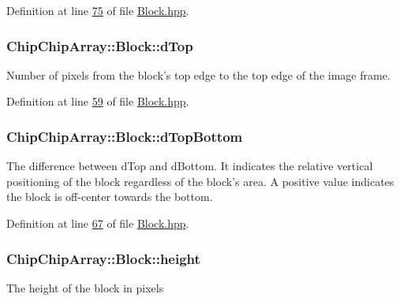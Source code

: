 Definition at line \hyperlink{Block_8hpp_source_l00075}{75} of file \hyperlink{Block_8hpp_source}{Block.\+hpp}.

\hypertarget{classChipChipArray_1_1Block_a4e792a05f677eafbeb9439a9e631c255}{
\subsubsection[{d\+Top}]{ Chip\+Chip\+Array\+::\+Block\+::d\+Top}}\label{classChipChipArray_1_1Block_a4e792a05f677eafbeb9439a9e631c255}
Number of pixels from the block's top edge to the top edge of the image frame. 

Definition at line \hyperlink{Block_8hpp_source_l00059}{59} of file \hyperlink{Block_8hpp_source}{Block.\+hpp}.

\hypertarget{classChipChipArray_1_1Block_a5b6e72665d0de840a123717e24ca5cf9}{
\subsubsection[{d\+Top\+Bottom}]{ Chip\+Chip\+Array\+::\+Block\+::d\+Top\+Bottom}}\label{classChipChipArray_1_1Block_a5b6e72665d0de840a123717e24ca5cf9}
The difference between d\+Top and d\+Bottom. It indicates the relative vertical positioning of the block regardless of the block's area. A positive value indicates the block is off-\/center towards the bottom. 

Definition at line \hyperlink{Block_8hpp_source_l00067}{67} of file \hyperlink{Block_8hpp_source}{Block.\+hpp}.

\hypertarget{classChipChipArray_1_1Block_aed94802c166c9b4553764eb637717a2a}{
\subsubsection[{height}]{ Chip\+Chip\+Array\+::\+Block\+::height}}\label{classChipChipArray_1_1Block_aed94802c166c9b4553764eb637717a2a}
The height of the block in pixels 


